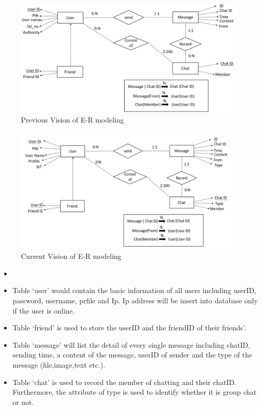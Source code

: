 \documentclass[a4paper,11pt]{article}
\begin{document}
\begin{itemize}
\begin{enumerate}
\begin{figure}[h!]
\centering
\includegraphics[width = 0.8 \textwidth ]{ERD.png}
\caption{\label{fig:ERD}Previous Vision of E-R modeling}
\end{figure}
\begin{figure}[h!]
\centering
\includegraphics[width = 0.8 \textwidth ]{current-erd.jpeg}
\caption{\label{fig:ERD}Current Vision of E-R modeling}
\end{figure}
\begin{itemize}
\item 
\item Table ‘user’ would contain the basic information of all users including userID, password, username, prfile and Ip. Ip address will be insert into database only if the user is online.
\item Table ‘friend’ is used to store the userID and the friendID of their friends’.
\item Table ‘message’ will list the detail of every single message including chatID, sending time, a content of the message, userID of sender and the type of the message (file,image,text etc.).
\item Table ‘chat’ is used to record the member of chatting and their chatID. Furthermore, the attribute of type is used to identify whether it is group chat or not. 
\end{itemize}




\end{enumerate}
\end{itemize}
\end{document}

